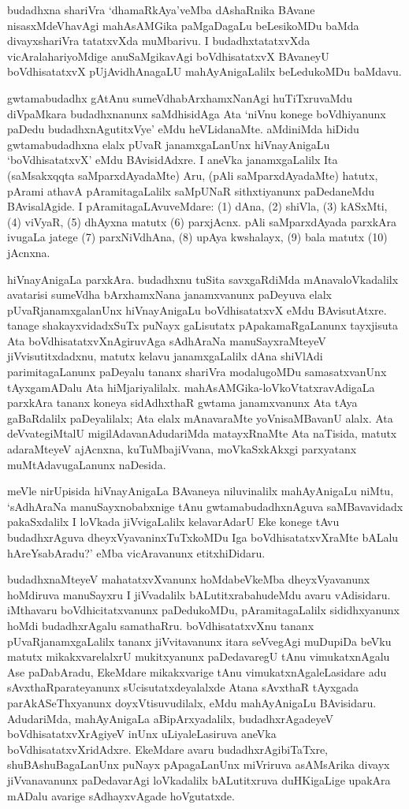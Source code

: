 budadhxna shariVra `dhamaRkAya'veMba dAshaRnika BAvane nisasxMdeVhavAgi mahA\-sAMGika paMgaDagaLu beLesikoMDu baMda divayxshariVra tatatxvXda muMbarivu. I budadhxtatatxvXda vicAralahariyoMdige anuSaMgikavAgi boVdhisatatxvX BAvaneyU boVdhisatatxvX pUjAvidhAnagaLU mahAyAnigaLalilx beLedukoMDu baMdavu.

gwtamabudadhx gAtAnu sumeVdhabArxhamxNanAgi huTiTxruvaMdu diVpaMkara budadhxnanunx saMdhisidAga Ata `niVnu konege boVdhiyanunx paDedu budadhxnAgutitxVye' eMdu heVLidanaMte. aMdiniMda hiDidu gwtamabudadhxna elalx pUvaR janamxgaLanUnx hiVnayAnigaLu `boVdhisatatxvX' eMdu BAvisidAdxre. I aneVka janamxgaLalilx Ita (saMsakxqqta saMparxdAyadaMte) Aru, (pAli saMparxdAyadaMte) hatutx, pArami athavA pAramitagaLalilx saMpUNaR sithxtiyanunx paDedaneMdu BAvisalAgide. I pAramitagaLAvuveMdare: (1) dAna, (2) shiVla, (3) kASxMti, (4) viVyaR, (5) dhAyxna matutx (6) parxjAcnx. pAli saMparxdAyada parxkAra ivugaLa jatege (7) parxNiVdhAna, (8) upAya kwshalayx, (9) bala matutx (10) jAcnxna.

hiVnayAnigaLa parxkAra. budadhxnu tuSita savxgaRdiMda mAnavaloVkadalilx avatarisi sumeVdha bArxhamxNana janamxvanunx paDeyuva elalx pUvaRjanamxgalanUnx hiVnayAnigaLu boVdhisatatxvX eMdu BAvisutAtxre. tanage shakayxvidadxSuTx puNayx gaLisutatx pApakamaR\-gaLanunx tayxjisuta Ata boVdhisatatxvXnAgiruvAga sAdhAraNa manuSayxraMteyeV jiVvisutitxdadxnu, matutx kelavu janamxgaLalilx dAna shiVlAdi parimitagaLanunx paDeyalu tananx shariVra modalu\-goMDu samasatxvanUnx tAyxgamADalu Ata hiMjariyalilalx. mahAsAMGika-loVkoV\-tatxravAdigaLa parxkAra tananx koneya sidAdhxthaR gwtama janamxvanunx Ata tAya gaBaRdalilx paDeyalilalx; Ata elalx mAnavaraMte yoVnisaMBavanU alalx. Ata deVvategiMtalU migilAdavanAdudariMda matayxRnaMte Ata naTisida, matutx adaraMteyeV ajAcnxna, kuTuMbajiVvana, moVkaSxkAkxgi parxyatanx muMtAdavugaLanunx naDesida.

meVle nirUpisida hiVnayAnigaLa BAvaneya niluvinalilx mahAyAnigaLu niMtu, `sAdhAraNa manuSayxnobabxnige tAnu gwtamabudadhxnAguva saMBavavidadx pakaSxdalilx I loVkada jiVvigaLalilx kelavarAdarU Eke konege tAvu budadhxrAguva dheyxVyavaninxTuTxkoMDu Iga boVdhisatatxvXraMte bALalu hAreYsabAradu?' eMba vicAravanunx etitxhiDidaru.

budadhxnaMteyeV mahatatxvXvanunx hoMdabeVkeMba dheyxVyavanunx hoMdiruva manu\-Sayxru I jiVvadalilx bALutitxrabahudeMdu avaru vAdisidaru. iMthavaru boVdhicitatx\-vanunx paDedukoMDu, pAramitagaLalilx sididhxyanunx hoMdi budadhxrAgalu samathaRru. boVdhisatatxvXnu tananx pUvaRjanamxgaLalilx tananx jiVvitavanunx itara seVvegAgi muDu\-piDa beVku matutx mikakxvarelalxrU mukitxyanunx paDedavaregU tAnu vimukatxnAgalu Ase paDa\-bAradu, EkeMdare mikakxvarige tAnu vimukatxnAgaleLasidare adu sAvxthaRparateyanunx sUcisutatxdeyalalxde Atana sAvxthaR tAyxgada parAkASeThxyanunx doyxVtisuvudilalx, eMdu mahAyAnigaLu BAvisidaru. AdudariMda, mahAyAnigaLa aBipArxyadalilx, budadhx\-rAgadeyeV boVdhisatatxvXrAgiyeV inUnx uLiyaleLasiruva aneVka boVdhisatatxvX\-ridAdxre. EkeMdare avaru budadhxrAgibiTaTxre, shuBAshuBagaLanUnx puNayx pApagaLanUnx miVriruva asAMsArika divayx jiVvanavanunx paDedavarAgi loVkadalilx bALutitxruva duHKigaLige upakAra mADalu avarige sAdhayxvAgade hoVgutatxde.

